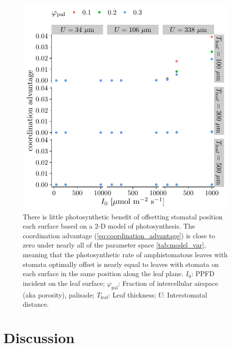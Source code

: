 \documentclass[webpdf,large,modern,unnumsec,namedate]{oup-authoring-template}
\begin{document}
\begin{figure}[ht]
\includegraphics[width = 5in]{figures/model_summary.pdf}
\caption{There is little photosynthetic benefit of offsetting stomatal position each surface based on a 2-D model of photosynthesis. The coordination advantage (\autoref{eq:coordination_advantage}) is close to zero under nearly all of the parameter space \autoref{tab:model_var}, meaning that the photosynthetic rate of amphistomatous leaves with stomata optimally offset is nearly equal to leaves with stomata on each surface in the same position along the leaf plane. $I_0$: PPFD incident on the leaf surface; $\varphi_\text{pal}$: Fraction of intercellular airspace (aka porosity), palisade; $T_\text{leaf}$: Leaf thickness; $U$: Interstomatal distance.}
\label{fig:model_summary}
\end{figure}

\section{Discussion}\label{discussion}
\end{document}
